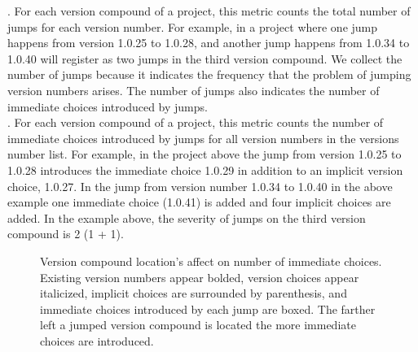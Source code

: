\documentclass[conference]{IEEEtran}
\begin{document}
.   For each version compound of a project, this metric counts the total number of jumps for each version number. 
 For example, in a project where one jump happens from version 1.0.25 to 1.0.28, and another jump happens from 1.0.34 to 1.0.40 will register as two jumps in the third version compound.
We collect the number of jumps because it indicates the frequency that the problem of jumping version numbers arises. 
The number of jumps also indicates the number of immediate choices introduced by jumps.\\

.  For each version compound of a project, this metric counts the number of immediate choices introduced by jumps for all version numbers in the versions number list. 
For example, in the project above the jump from version 1.0.25 to 1.0.28 introduces the immediate choice 1.0.29 in addition to an implicit version choice, 1.0.27.
In the jump from version number 1.0.34 to 1.0.40 in the above example one immediate choice (1.0.41) is added and four implicit choices are added.
In the example above, the severity of jumps on the third version compound is 
2 (1 + 1).



\begin{figure}
 \begin{adjustbox}{width=.5\textwidth}

\end{adjustbox}
\caption{Version compound location's affect on number of immediate choices. Existing version numbers appear bolded, version choices appear italicized, implicit choices are surrounded by parenthesis, and immediate choices introduced by each jump are boxed. The farther left a jumped version compound is located the more immediate choices are introduced.}
\label{fig:ExVCJumps}
\end{figure}
\end{document}
